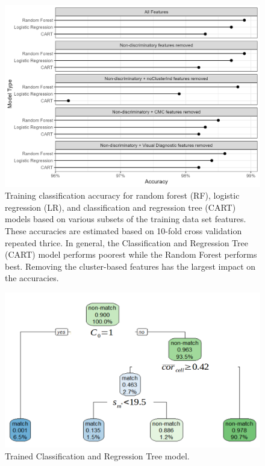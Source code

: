 \documentclass[
]{jdssv}
\begin{document}
\begin{CodeChunk}
\begin{figure}[htbp]

{\centering \includegraphics[width=.8\textwidth]{figures/trainingAccuracy} 

}

\caption{\label{fig:trainingAccuracy} Training classification accuracy for random forest (RF), logistic  regression (LR), and classification and regression tree (CART) models based on various subsets of the training data set features. These accuracies are estimated based on 10-fold cross validation repeated thrice. In general, the Classification and Regression Tree (CART) model performs poorest while the Random Forest performs best. Removing the cluster-based features has the largest impact on the accuracies.}\label{fig:unnamed-chunk-25}
\end{figure}
\end{CodeChunk}

\begin{CodeChunk}
\begin{figure}[htbp]

{\centering \includegraphics[width=\textwidth]{images/trainedCART_labeled} 

}

\caption{\label{fig:trainedCART} Trained Classification and Regression Tree model.}\label{fig:unnamed-chunk-26}
\end{figure}
\end{CodeChunk}
\end{document}
